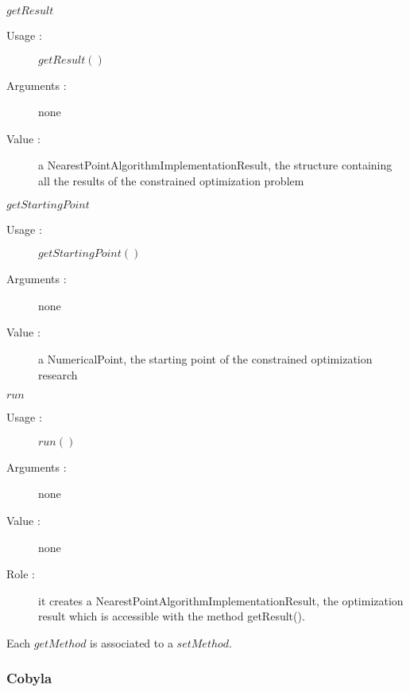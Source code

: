 \begin{description}
\begin{description}
  \item $getResult$
    \begin{description}
    \item[Usage :] $getResult()$
    \item[Arguments :] none
    \item[Value :] a NearestPointAlgorithmImplementationResult, the structure containing all the results of the constrained optimization problem
    \end{description}
    \bigskip

  \item $getStartingPoint$
    \begin{description}
    \item[Usage :] $getStartingPoint()$
    \item[Arguments :] none
    \item[Value :] a NumericalPoint, the starting point of the constrained optimization research
    \end{description}
    \bigskip

  \item $run$
    \begin{description}
    \item[Usage :] $run()$
    \item[Arguments :] none
    \item[Value :] none
    \item[Role :] it creates a NearestPointAlgorithmImplementationResult, the optimization result which is accessible with the method getResult().
    \end{description}
  \end{description}

  Each  $getMethod$  is associated to a $setMethod$.


\end{description}

\newpage \subsubsection{Cobyla}

